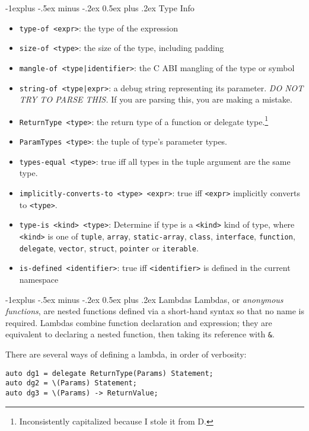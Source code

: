 \documentclass[a4paper,10pt,landscape]{article}
\makeatletter
\newenvironment{segment}[1]
{\begin{mdframed}[roundcorner=5pt]\subsection{#1}}
{\end{mdframed}\vspace{2pt plus 5pt}}
\renewcommand{\subsection}{\@startsection{subsection}{2}{0mm}%
			      {-1explus -.5ex minus -.2ex}%
			      {0.5ex plus .2ex}%
			      {\normalfont\normalsize\bfseries}}
\makeatother
\begin{document}
\begin{multicols}{3}
\begin{segment}{Type Info}
\begin{itemize}
\item\texttt{type-of <expr>}: the type of the expression
\item\texttt{size-of <type>}: the size of the type, including padding
\item\texttt{mangle-of <type|identifier>}: the C ABI mangling of the type or symbol
\item\texttt{string-of <type|expr>}: a debug string representing its parameter. \emph{DO NOT TRY TO PARSE THIS.} If you are
parsing this, you are making a mistake.
\item\texttt{ReturnType <type>}: the return type of a function or delegate type.\footnote{Inconsistently capitalized because I stole it from D.}
\item\texttt{ParamTypes <type>}: the tuple of type's parameter types.
\item\texttt{types-equal <type>}: true iff all types in the tuple argument are the same type.
\item\texttt{implicitly-converts-to <type> <expr>}: true iff \texttt{<expr>} implicitly converts to \texttt{<type>}.
\item\texttt{type-is <kind> <type>}: Determine if type is a \texttt{<kind>} kind of type, where \texttt{<kind>} is one of
\texttt{tuple}, \texttt{array}, \texttt{static-array}, \texttt{class}, \texttt{interface}, \texttt{function}, \texttt{delegate}, 
\texttt{vector}, \texttt{struct}, \texttt{pointer} or \texttt{iterable}.
\item\texttt{is-defined <identifier>}: true iff \texttt{<identifier>} is defined in the current namespace

\end{itemize}

\end{segment}

\begin{segment}{Lambdas}
Lambdas, or \emph{anonymous functions}, are nested functions defined via a short-hand syntax
so that no name is required. Lambdas combine function declaration and expression; they are
equivalent to declaring a nested function, then taking its reference with \texttt{\&}.

There are several ways of defining a lambda, in order of verbosity:

\begin{lstlisting}
auto dg1 = delegate ReturnType(Params) Statement;
auto dg2 = \(Params) Statement;
auto dg3 = \(Params) -> ReturnValue;
\end{lstlisting}


\end{segment}
\end{multicols}
\end{document}
